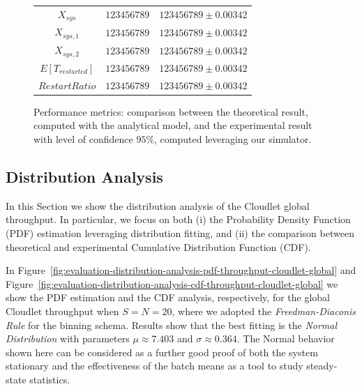 \begin{figure}
\begin{center}
\begin{tabular}{|c||c|c|}
			$X_{sys}$  & $123456789$ & $123456789\pm 0.00342$ \\
			$X_{sys,1}$  & $123456789$ & $123456789\pm 0.00342$ \\
			$X_{sys,2}$  & $123456789$ & $123456789\pm 0.00342$ \\
			\hline
			$E[T_{restarted}]$  & $123456789$ & $123456789\pm 0.00342$ \\
			$RestartRatio$  & $123456789$ & $123456789\pm 0.00342$ \\			
			\hline
		\end{tabular}
	\end{center}
	\caption{Performance metrics: comparison between the theoretical result, computed with the analytical model, and the experimental result with level of confidence $95\%$, computed leveraging our simulator.}
	\label{tbl:evaluation-performance-metrics}
\end{figure}

\subsection{Distribution Analysis}
\label{sec:evaluation-distribution-analysis}
In this Section we show the distribution analysis of the Cloudlet global throughput. 
In particular, we focus on both (i) the Probability Density Function (PDF) estimation leveraging distribution fitting, and (ii) the comparison between theoretical and experimental Cumulative Distribution Function (CDF).

In Figure~\ref{fig:evaluation-distribution-analysis-pdf-throughput-cloudlet-global} and  Figure~\ref{fig:evaluation-distribution-analysis-cdf-throughput-cloudlet-global} we show the PDF estimation and the CDF analysis, respectively, for the global Cloudlet throughput when $S=N=20$, where we adopted the \textit{Freedman-Diaconis Rule} for the binning schema.
Results show that the best fitting is the \textit{Normal Distribution} with parameters $\mu\approx7.403$ and $\sigma\approx0.364$.
%
The Normal behavior shown here can be considered as a further good proof of both the system stationary and the effectiveness of the batch means as a tool to study steady-state statistics.

